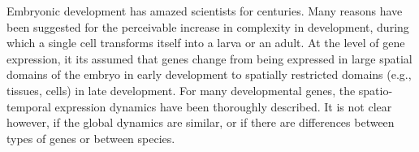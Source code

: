 
Embryonic development has amazed scientists for centuries.
%
Many reasons have been suggested for the perceivable increase in complexity in development, during which a single cell transforms itself into a larva or an adult.
%
%
At the level of gene expression, 
it its assumed that genes change from being expressed in large spatial domains of the embryo in early development to spatially restricted domains (e.g., tissues, cells) in late development.
%
For many developmental genes, the spatio-temporal expression dynamics
have been thoroughly described.
It is not clear however, if the global dynamics are similar,
or if there are differences between types of genes or between species.

